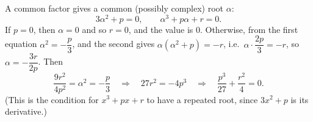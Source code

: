 A common factor gives a common (possibly complex) root $\alpha$:
\[
3\alpha^2+p=0,\qquad\alpha^3+p\alpha+r=0 .
\]
If $p=0$, then $\alpha=0$ and so $r=0$, and the value is $0$. Otherwise, from the first equation $\alpha^2=-\dfrac {p}{3}$, and the second gives $\alpha\left(\alpha^2+p\right)=-r$, i.e.\ $\alpha\cdot\dfrac{2p}{3}=-r$, so $\alpha=-\dfrac{3r}{2p}$. Then
\[
\dfrac{9r^2}{4p^2}=\alpha^2=-\dfrac {p}{3}\quad\Longrightarrow\quad27r^2=-4p^3\quad\Longrightarrow\quad\dfrac{p^3}{27}+\dfrac{r^2}{4}=\boxed{0}.
\]
(This is the condition for $x^3+px+r$ to have a repeated root, since $3x^2+p$ is its derivative.)
